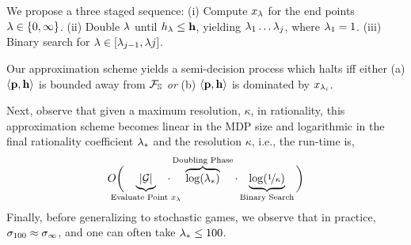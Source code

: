 We propose a three staged sequence: (i) Compute $x_\lambda$ for the end
points $\lambda \in \{0, \infty\}$.  (ii) Double $\lambda$ until $h_\lambda \leq
\mathbf{h}$, yielding $\lambda_1\ldots \lambda_j$, where $\lambda_1 = 1$.
(iii) Binary search for $\lambda \in [\lambda_{j-1}, \lambda{j}]$.
\begin{mdframed}
  Our approximation scheme yields a semi-decision process which halts
  iff either (a) $\langle \mathbf{p}, \mathbf{h} \rangle$ is
  bounded away from $\mathcal{F}_{\mathbb{S}}$ \emph{or} (b)
  $\langle \mathbf{p}, \mathbf{h} \rangle$ is dominated by
  $x_{\lambda_i}$.
\end{mdframed}
Next, observe that given a maximum resolution, $\kappa$, in
rationality, this approximation scheme becomes linear in the MDP size
and logarithmic in the final rationality coefficient $\lambda_*$ and the
resolution $\kappa$, i.e., the run-time is,
\begin{equation}
  O\bigg(\hspace{-1.4em}\underbrace{|\sg|}_{\text{Evaluate Point $x_\rat$}}\hspace{-1.4em}\cdot\overbrace{\log(\rat_*)}^{\text{Doubling Phase}}\cdot\underbrace{\log(\nicefrac{1}{\kappa})}_{\text{Binary Search}}\bigg)
\end{equation}
Finally, before generalizing to stochastic games, we observe that in
practice, $\sigma_{100} \approx \sigma_\infty$, and one can often take
$\lambda_* \leq 100$.

